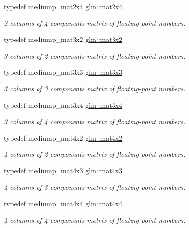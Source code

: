 \begin{DoxyCompactItemize}
typedef mediump\-\_\-mat2x4 \hyperlink{group__core__types_gaa78542b8bfa06cd48c53dcd0d0a00707}{glm\-::mat2x4}
\begin{DoxyCompactList}\small\item\em 2 columns of 4 components matrix of floating-\/point numbers. \end{DoxyCompactList}\item 
typedef mediump\-\_\-mat3x2 \hyperlink{group__core__types_gae38fe62de819d214ac89f1f4df343844}{glm\-::mat3x2}
\begin{DoxyCompactList}\small\item\em 3 columns of 2 components matrix of floating-\/point numbers. \end{DoxyCompactList}\item 
typedef mediump\-\_\-mat3x3 \hyperlink{group__core__types_gae01cfe70eb34df727346f82c7c08acd7}{glm\-::mat3x3}
\begin{DoxyCompactList}\small\item\em 3 columns of 3 components matrix of floating-\/point numbers. \end{DoxyCompactList}\item 
typedef mediump\-\_\-mat3x4 \hyperlink{group__core__types_ga75499a515649f0db9593beb23ab084a5}{glm\-::mat3x4}
\begin{DoxyCompactList}\small\item\em 3 columns of 4 components matrix of floating-\/point numbers. \end{DoxyCompactList}\item 
typedef mediump\-\_\-mat4x2 \hyperlink{group__core__types_gaf8b375fbef797b3730fcddc7bd60b59f}{glm\-::mat4x2}
\begin{DoxyCompactList}\small\item\em 4 columns of 2 components matrix of floating-\/point numbers. \end{DoxyCompactList}\item 
typedef mediump\-\_\-mat4x3 \hyperlink{group__core__types_ga605b649496ad53379e8ac6d7a4534667}{glm\-::mat4x3}
\begin{DoxyCompactList}\small\item\em 4 columns of 3 components matrix of floating-\/point numbers. \end{DoxyCompactList}\item 
typedef mediump\-\_\-mat4x4 \hyperlink{group__core__types_gafe3341c717b9f9725019a10fd1dcf9c1}{glm\-::mat4x4}
\begin{DoxyCompactList}\small\item\em 4 columns of 4 components matrix of floating-\/point numbers. \end{DoxyCompactList}\item 

\end{DoxyCompactItemize}
